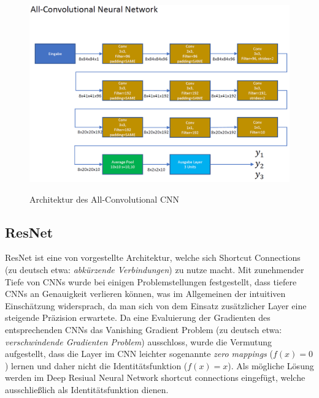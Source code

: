 \begin{figure}[H]
\centering
\caption{Architektur des All-Convolutional CNN}
\includegraphics[angle=90, scale=0.5]{pictures/inception/AllConvCNN}
\label{fig:arch_allcnn}
\end{figure}

\subsection{ResNet}
\label{sek:resnet}
ResNet ist eine von \textcite{He_2016} vorgestellte Architektur, welche sich Shortcut Connections (zu deutsch etwa: \textit{abkürzende Verbindungen}) zu nutze macht. Mit zunehmender Tiefe von CNNs wurde bei einigen Problemstellungen festgestellt, dass tiefere CNNs an Genauigkeit verlieren können, was im Allgemeinen der intuitiven Einschätzung widersprach, da man sich von dem Einsatz zusätzlicher Layer eine steigende Präzision erwartete. Da eine Evaluierung der Gradienten des entsprechenden CNNs das Vanishing Gradient Problem (zu deutsch etwa: \textit{verschwindende Gradienten Problem}) ausschloss, wurde die Vermutung aufgestellt, dass die Layer im CNN leichter sogenannte \textit{zero mappings} ($f(x) = 0$) lernen und daher nicht die Identitätsfunktion ($f(x) = x$). Als mögliche Lösung werden im Deep Resiual Neural Network shortcut connections eingefügt, welche ausschließlich als Identitätsfunktion dienen. 

